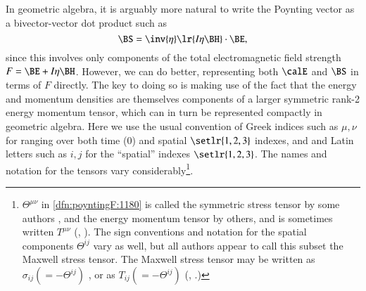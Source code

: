 In geometric algebra, it is arguably more natural to write the Poynting vector as a bivector-vector dot product such as
\begin{dmath}\label{eqn:poyntingF:1100}
\BS = \inv{\eta} \lr{ I \eta \BH } \cdot \BE,
\end{dmath}
since this involves only components of the total electromagnetic field strength \( F = \BE + I \eta \BH \).
However, we can do better, representing both \( \calE \) and \( \BS \) in terms of \( F \) directly.  The key to doing so is making use of the fact that
the energy and momentum densities are themselves components of a larger symmetric rank-2 energy momentum tensor, which can in turn be represented
compactly in geometric algebra.
Here we use the usual convention of Greek indices such as \( \mu,\nu \) for ranging over both time (0) and spatial \( \setlr{1,2,3} \) indexes, and
and Latin letters such as \( i, j \)
for the ``spatial'' indexes
\( \setlr{1,2,3} \).
The names and notation for the tensors vary considerably\footnote{\( \Theta^{\mu\nu} \) in
\cref{dfn:poyntingF:1180}
is called the symmetric
stress tensor by some authors \citep{jackson1975cew},
and the energy momentum tensor by others, and is sometimes written \( T^{\mu\nu} \) (\citep{landau1980classical}, \citep{doran2003gap}).
The sign conventions and notation for the spatial components \( \Theta^{ij} \) vary as well, but all authors appear to call this subset the Maxwell stress tensor.
The Maxwell stress tensor may be written as \( \sigma_{ij} (=-\Theta^{ij}) \) \citep{landau1980classical}, or as
\( T_{ij} (=-\Theta^{ij}) \)
(\citep{griffiths1999introduction}, \citep{jackson1975cew}.)
}.

